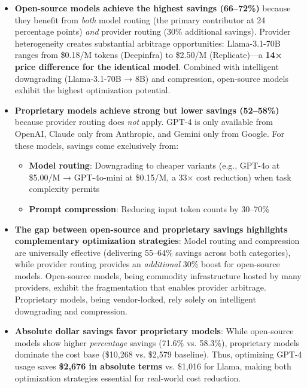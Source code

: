 \documentclass[english]{article}
\begin{document}
\begin{itemize}
\item \textbf{Open-source models achieve the highest savings (66--72\%)} because they benefit from \emph{both} model routing (the primary contributor at 24 percentage points) \emph{and} provider routing (30\% additional savings). Provider heterogeneity creates substantial arbitrage opportunities: Llama-3.1-70B ranges from \$0.18/M tokens (Deepinfra) to \$2.50/M (Replicate)—a \textbf{14× price difference for the identical model}. Combined with intelligent downgrading (Llama-3.1-70B → 8B) and compression, open-source models exhibit the highest optimization potential.

\item \textbf{Proprietary models achieve strong but lower savings (52--58\%)} because provider routing does \emph{not} apply. GPT-4 is only available from OpenAI, Claude only from Anthropic, and Gemini only from Google. For these models, savings come exclusively from:
\begin{itemize}
    \item \textbf{Model routing}: Downgrading to cheaper variants (e.g., GPT-4o at \$5.00/M → GPT-4o-mini at \$0.15/M, a 33× cost reduction) when task complexity permits
    \item \textbf{Prompt compression}: Reducing input token counts by 30--70\%
\end{itemize}

\item \textbf{The gap between open-source and proprietary savings highlights complementary optimization strategies}: Model routing and compression are universally effective (delivering 55--64\% savings across both categories), while provider routing provides an \emph{additional} 30\% boost for open-source models. Open-source models, being commodity infrastructure hosted by many providers, exhibit the fragmentation that enables provider arbitrage. Proprietary models, being vendor-locked, rely solely on intelligent downgrading and compression.

\item \textbf{Absolute dollar savings favor proprietary models}: While open-source models show higher \emph{percentage} savings (71.6\% vs. 58.3\%), proprietary models dominate the cost base (\$10,268 vs. \$2,579 baseline). Thus, optimizing GPT-4 usage saves \textbf{\$2,676 in absolute terms} vs. \$1,016 for Llama, making both optimization strategies essential for real-world cost reduction.
\end{itemize}
\end{document}

